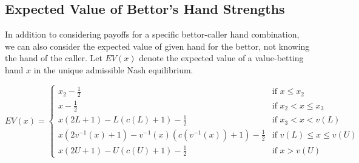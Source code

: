 \documentclass[../../main/main.tex]{subfiles}
\begin{document}
\subsection{Expected Value of Bettor's Hand Strengths}
\label{bettor_ev}


In addition to considering payoffs for a specific bettor-caller hand combination, we can also consider the expected value of given hand for the bettor, not knowing the hand of the caller. Let $EV(x)$ denote the expected value of a value-betting hand $x$ in the unique admissible Nash equilibrium.

\begin{theorem}
    \label{thm:ev_bettor}
    \begin{equation}
        EV(x) = \begin{cases}
            x_2-\frac{1}{2} & \text{if } x \leq x_2 \\
            x-\frac{1}{2} & \text{if } x_2 < x \le x_3 \\
            x(2L + 1) - L(c(L) + 1) - \frac{1}{2} & \text{if } x_3 < x < v(L) \\
            x(2v^{-1}(x) + 1) - v^{-1}(x)(c(v^{-1}(x)) + 1) - \frac{1}{2} & \text{if } v(L) \leq x \leq v(U) \\
            x(2U + 1) - U(c(U) + 1) - \frac{1}{2} & \text{if } x > v(U)
        \end{cases}
    \end{equation}
\end{theorem}
\end{document}
